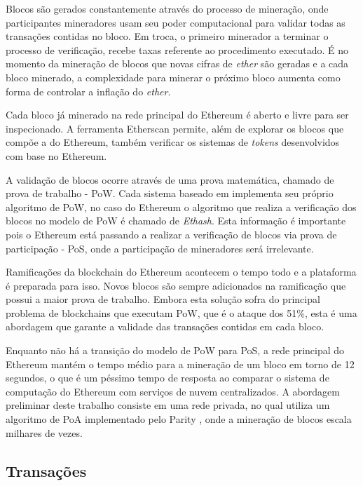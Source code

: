 \documentclass[tcc,capa]{texufpel}
\begin{document}
	Blocos são gerados constantemente através do processo de mineração, onde participantes mineradores usam seu poder computacional para validar todas as transações contidas no bloco. Em troca, o primeiro minerador a terminar o processo de verificação, recebe taxas referente ao procedimento executado. É no momento da mineração de blocos que novas cifras de \textit{ether} são geradas e a cada bloco minerado, a complexidade para minerar o próximo bloco aumenta como forma de controlar a inflação do \textit{ether}.
	
	Cada bloco já minerado na rede principal do Ethereum é aberto e livre para ser inspecionado. A ferramenta Etherscan \cite{team2017etherscan} permite, além de explorar os blocos que compõe a \bchain do Ethereum, também verificar os sistemas de \textit{tokens} desenvolvidos com base no Ethereum.
	
	A validação de blocos ocorre através de uma prova matemática, chamado de prova de trabalho - PoW. Cada sistema baseado em \bchain implementa seu próprio algoritmo de PoW, no caso do Ethereum o algoritmo que realiza a verificação dos blocos no modelo de PoW é chamado de \textit{Ethash}. Esta informação é importante pois o Ethereum está passando a realizar a verificação de blocos via prova de participação - PoS, onde a participação de mineradores será irrelevante.
	
	Ramificações da blockchain do Ethereum acontecem o tempo todo e a plataforma é preparada para isso. Novos blocos são sempre adicionados na ramificação que possui a maior prova de trabalho. Embora esta solução sofra do principal problema de blockchains que executam PoW, que é o ataque dos 51\%, esta é uma abordagem que garante a validade das transações contidas em cada bloco.
	
	Enquanto não há a transição do modelo de PoW para PoS, a rede principal do Ethereum mantém o tempo médio para a mineração de um bloco em torno de 12 segundos, o que é um péssimo tempo de resposta ao comparar o sistema de computação do Ethereum com serviços de nuvem centralizados. A abordagem preliminar deste trabalho consiste em uma rede privada, no qual utiliza um algoritmo de PoA implementado pelo Parity \cite{parity2018wiki}, onde a mineração de blocos escala milhares de vezes.

    
	\subsection{Transações}\label{ssc:transacoes}
	
\end{document}

